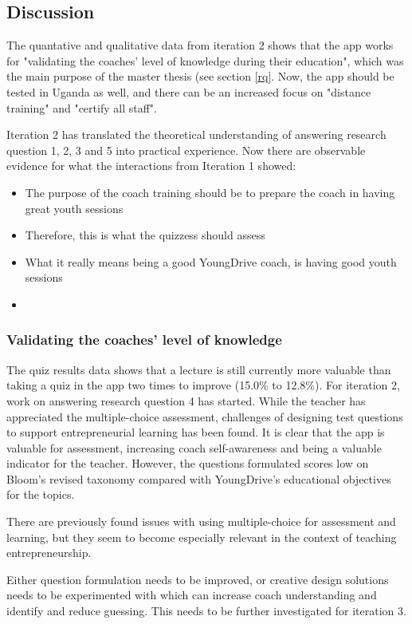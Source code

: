 \subsection{Discussion}

The quantative and qualitative data from iteration 2 shows that the app works for "validating the coaches' level of knowledge during their education", which was the main purpose of the master thesis (see section \ref{rq}. Now, the app should be tested in Uganda as well, and there can be an increased focus on "distance training" and "certify all staff".

Iteration 2 has translated the theoretical understanding of answering research question 1, 2, 3 and 5 into practical experience. Now there are observable evidence for what the interactions from Iteration 1 showed:

\begin{itemize}
\item The purpose of the coach training should be to prepare the coach in having great youth sessions
\item Therefore, this is what the quizzess should assess
\item What it really means being a good YoungDrive coach, is having good youth sessions
\item
\end{itemize}

\subsubsection{Validating the coaches' level of knowledge}
The quiz results data shows that a lecture is still currently more valuable than taking a quiz in the app two times to improve (15.0\% to 12.8\%). For iteration 2, work on answering research question 4 has started. While the teacher has appreciated the multiple-choice assessment, challenges of designing test questions to support entrepreneurial learning has been found. It is clear that the app is valuable for assessment, increasing coach self-awareness and being a valuable indicator for the teacher. However, the questions formulated scores low on Bloom's revised taxonomy \cite{bloom} compared with YoungDrive's educational objectives for the topics.

There are previously found issues with using multiple-choice for assessment and learning, but they seem to become especially relevant in the context of teaching entrepreneurship.

Either question formulation needs to be improved, or creative design solutions needs to be experimented with which can increase coach understanding and identify and reduce guessing. This needs to be further investigated for iteration 3.


